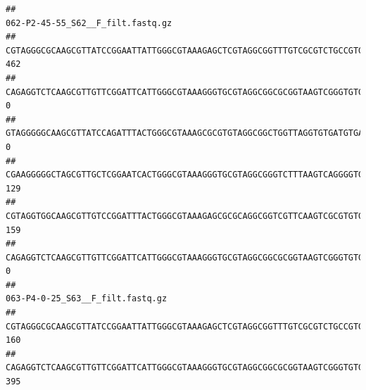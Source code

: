 \documentclass[]{article}
\begin{document}
\begin{verbatim}
##                                                                                                                                                                                                                                                           062-P2-45-55_S62__F_filt.fastq.gz
## CGTAGGGCGCAAGCGTTATCCGGAATTATTGGGCGTAAAGAGCTCGTAGGCGGTTTGTCGCGTCTGCCGTGAAAGTCCGGGGCTCAACTCCGGATCTGCGGTGGGTACGGGCAGACTAGAGTGATGTAGGGGAGACTGGAATTCCTGGTGTAGCGGTGAAATGCGCAGATATCAGGAGGAACACCGATGGCGAAGGCAGGTCTCTGGGCATTAACTGACGCTGAGGAGCGAAAGCATGGGGAGCGAACA                               462
## CAGAGGTCTCAAGCGTTGTTCGGATTCATTGGGCGTAAAGGGTGCGTAGGCGGCGCGGTAAGTCGGGTGTGAAATCTCGGAGCTTAACTCCGAAACTGCATTCGATACTGCCGTGCTTGAGGACTGGAGAGGAGACTGGAATTTACGGTGTAGCGGTGAAATGCGTAGATATCGTAAGGAAGACCAGTGGCGAAGGCGGGTCTCTGGACAGTTCCTGACGCTGAGGCACGAAGGCCAGGGGAGCAAACG                                 0
## GTAGGGGGCAAGCGTTATCCAGATTTACTGGGCGTAAAGCGCGTGTAGGCGGCTGGTTAGGTGTGATGTGAAATCTTCCGGCTCAACCGGAAAACTGCATTGCAAACCGGCCTGGCTAGAGTGCAGGAGAGGGAAGCGGAATTCCAGGTGTAGCGGTGAAATGCGTAGATATCTGGAGGAACACCAGTGGCGAAGGCGGCTTCCTGGCCTGCAACTGACGCTGAGACGCGAAAGCGTGGGGAGCGAAC                                  0
## CGAAGGGGGCTAGCGTTGCTCGGAATCACTGGGCGTAAAGGGTGCGTAGGCGGGTCTTTAAGTCAGGGGTGAAATCCTGGAGCTCAACTCCAGAACTGCCTTTGATACTGAAGATCTTGAGTTCGGGAGAGGTGAGTGGAACTGCGAGTGTAGAGGTGAAATTCGTAGATATTCGCAAGAACACCAGTGGCGAAGGCGGCTCACTGGCCCGATACTGACGCTGAGGCACGAAAGCGTGGGGAGCAAACA                               129
## CGTAGGTGGCAAGCGTTGTCCGGATTTACTGGGCGTAAAGAGCGCGCAGGCGGTCGTTCAAGTCGCGTGTGAAAGCCCCCGGCTCAACTGGGGAGGGTCACGCGATACTGATCGACTCGAAGGCAGGAGAGGGTAGTGGAATTCCCGGTGTAGTGGTGAAATGCGTAGATATCGGGAGGAACACCAGTGGCGAAGGCGACTACCTGGCCTGTTCTTGACGCTGAGGCGCGAAAGCTAGGGGAGCAAACG                               159
## CAGAGGTCTCAAGCGTTGTTCGGATTCATTGGGCGTAAAGGGTGCGTAGGCGGCGCGGTAAGTCGGGTGTGAAATCTCGGGGCTTAACTCCGAAACTGCATTCGATACTGCCGTGCTTGAGGACTGGAGAGGAGACTGGAATTTACGGTGTAGCGGTGAAATGCGTAGATATCGTAAGGAAGACCAGTGGCGAAGGCGGGTCTCTGGACAGTTCCTGACGCTGAGGCACGAAGGCCAGGGGAGCAAACG                                 0
##                                                                                                                                                                                                                                                           063-P4-0-25_S63__F_filt.fastq.gz
## CGTAGGGCGCAAGCGTTATCCGGAATTATTGGGCGTAAAGAGCTCGTAGGCGGTTTGTCGCGTCTGCCGTGAAAGTCCGGGGCTCAACTCCGGATCTGCGGTGGGTACGGGCAGACTAGAGTGATGTAGGGGAGACTGGAATTCCTGGTGTAGCGGTGAAATGCGCAGATATCAGGAGGAACACCGATGGCGAAGGCAGGTCTCTGGGCATTAACTGACGCTGAGGAGCGAAAGCATGGGGAGCGAACA                              160
## CAGAGGTCTCAAGCGTTGTTCGGATTCATTGGGCGTAAAGGGTGCGTAGGCGGCGCGGTAAGTCGGGTGTGAAATCTCGGAGCTTAACTCCGAAACTGCATTCGATACTGCCGTGCTTGAGGACTGGAGAGGAGACTGGAATTTACGGTGTAGCGGTGAAATGCGTAGATATCGTAAGGAAGACCAGTGGCGAAGGCGGGTCTCTGGACAGTTCCTGACGCTGAGGCACGAAGGCCAGGGGAGCAAACG                              395

\end{verbatim}
\end{document}
